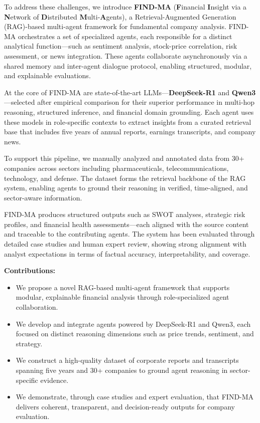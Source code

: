 \documentclass[11pt]{article}
\begin{document}
To address these challenges, we introduce \textbf{FIND-MA} (\textbf{F}inancial \textbf{I}nsight via a \textbf{N}etwork of \textbf{D}istributed \textbf{M}ulti-\textbf{A}gents), a Retrieval-Augmented Generation (RAG)-based multi-agent framework for fundamental company analysis. FIND-MA orchestrates a set of specialized agents, each responsible for a distinct analytical function—such as sentiment analysis, stock-price correlation, risk assessment, or news integration. These agents collaborate asynchronously via a shared memory and inter-agent dialogue protocol, enabling structured, modular, and explainable evaluations.

At the core of FIND-MA are state-of-the-art LLMs—\textbf{DeepSeek-R1} and \textbf{Qwen3}—selected after empirical comparison for their superior performance in multi-hop reasoning, structured inference, and financial domain grounding. Each agent uses these models in role-specific contexts to extract insights from a curated retrieval base that includes five years of annual reports, earnings transcripts, and company news.

To support this pipeline, we manually analyzed and annotated data from 30+ companies across sectors including pharmaceuticals, telecommunications, technology, and defense. The dataset forms the retrieval backbone of the RAG system, enabling agents to ground their reasoning in verified, time-aligned, and sector-aware information.

FIND-MA produces structured outputs such as SWOT analyses, strategic risk profiles, and financial health assessments—each aligned with the source content and traceable to the contributing agents. The system has been evaluated through detailed case studies and human expert review, showing strong alignment with analyst expectations in terms of factual accuracy, interpretability, and coverage.

\vspace{1em}
\noindent\textbf{Contributions:}
\begin{itemize}
    \item We propose a novel RAG-based multi-agent framework that supports modular, explainable financial analysis through role-specialized agent collaboration.
    \item We develop and integrate agents powered by DeepSeek-R1 and Qwen3, each focused on distinct reasoning dimensions such as price trends, sentiment, and strategy.
    \item We construct a high-quality dataset of corporate reports and transcripts spanning five years and 30+ companies to ground agent reasoning in sector-specific evidence.
    \item We demonstrate, through case studies and expert evaluation, that FIND-MA delivers coherent, transparent, and decision-ready outputs for company evaluation.
\end{itemize}
\end{document}
